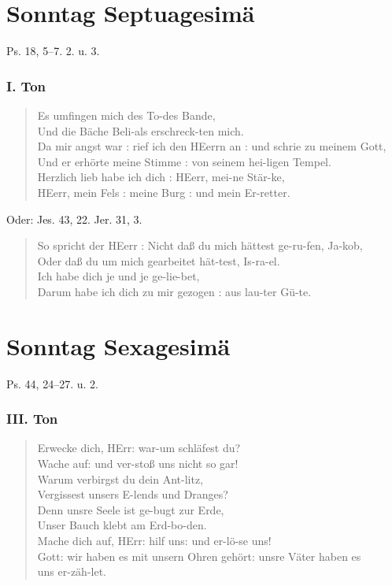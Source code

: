 \section{Sonntag Septuagesimä}

Ps. 18, 5–7. 2. u. 3.

\subsubsection{I. Ton}
\begin{verse}
Es umfingen mich des To-des Bande,\\
Und die Bäche Beli-als erschreck-ten mich.\\
Da mir angst war : rief ich den HEerrn an : und schrie zu meinem Gott,\\
Und er erhörte meine Stimme : von seinem hei-ligen Tempel.\\
Herzlich lieb habe ich dich : HEerr, mei-ne Stär-ke,\\
HEerr, mein Fels : meine Burg : und mein Er-retter.
\end{verse}

Oder: Jes. 43, 22. Jer. 31, 3.

\begin{verse}
So spricht der HEerr : Nicht daß du mich hättest ge-ru-fen, Ja-kob,\\
Oder daß du um mich gearbeitet hät-test, Is-ra-el.\\
Ich habe dich je und je ge-lie-bet,\\
Darum habe ich dich zu mir gezogen : aus lau-ter Gü-te.
\end{verse}

\section{Sonntag Sexagesimä}

Ps. 44, 24–27. u. 2.

\subsubsection{III. Ton}
\begin{verse}
Erwecke dich, HErr: war-um schläfest du?\\
Wache auf: und ver-stoß uns nicht so gar!\\
Warum verbirgst du dein Ant-litz,\\
Vergissest unsers E-lends und Dranges?\\
Denn unsre Seele ist ge-bugt zur Erde,\\
Unser Bauch klebt am Erd-bo-den.\\
Mache dich auf, HErr: hilf uns: und er-lö-se uns!\\
Gott: wir haben es mit unsern Ohren gehört: unsre Väter haben es\\
uns er-zäh-let.
\end{verse}


